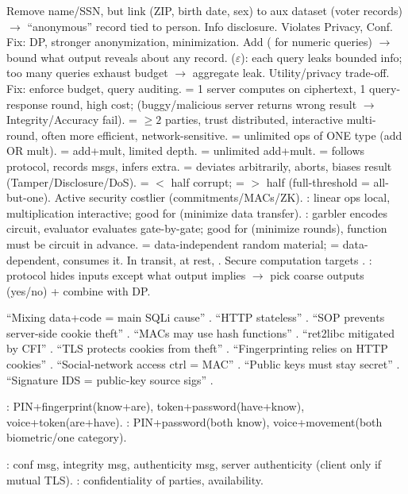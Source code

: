 Remove name/SSN, but link  (ZIP, birth date, sex) to aux dataset (voter records) $\to$ ``anonymous'' record tied to person. Info disclosure. Violates Privacy, Conf. Fix: DP, stronger anonymization, minimization.
Add  ( for numeric queries) $\to$ bound what output reveals about any record.  ($\varepsilon$): each query leaks bounded info; too many queries exhaust budget $\to$ aggregate leak. Utility/privacy trade-off. Fix: enforce budget, query auditing.
 = 1 server computes on ciphertext, 1 query-response round, high cost;  (buggy/malicious server returns wrong result $\to$ Integrity/Accuracy fail).  = $\ge 2$ parties, trust distributed, interactive multi-round, often more efficient, network-sensitive.
 = unlimited ops of ONE type (add OR mult).  = add+mult, limited depth.  = unlimited add+mult.
 = follows protocol, records msgs, infers extra.  = deviates arbitrarily, aborts, biases result (Tamper/Disclosure/DoS).  = $<$ half corrupt;  = $>$ half (full-threshold = all-but-one). Active security costlier (commitments/MACs/ZK).
: linear ops local, multiplication interactive; good for  (minimize data transfer). : garbler encodes circuit, evaluator evaluates gate-by-gate; good for  (minimize rounds), function must be circuit in advance.  = data-independent random material;  = data-dependent, consumes it.
In transit, at rest, . Secure computation targets . : protocol hides inputs except what output implies $\to$ pick coarse outputs (yes/no) + combine with DP.

{\fivept
``Mixing data+code = main SQLi cause'' . ``HTTP stateless'' . ``SOP prevents server-side cookie theft'' . ``MACs may use hash functions'' . ``ret2libc mitigated by CFI'' . ``TLS protects cookies from theft'' . ``Fingerprinting relies on HTTP cookies'' . ``Social-network access ctrl = MAC'' . ``Public keys must stay secret'' . ``Signature IDS = public-key source sigs'' .
\par{}: PIN+fingerprint(know+are), token+password(have+know), voice+token(are+have). : PIN+password(both know), voice+movement(both biometric/one category).
\par{}: conf msg, integrity msg, authenticity msg, server authenticity (client only if mutual TLS). : confidentiality of parties, availability.
}
